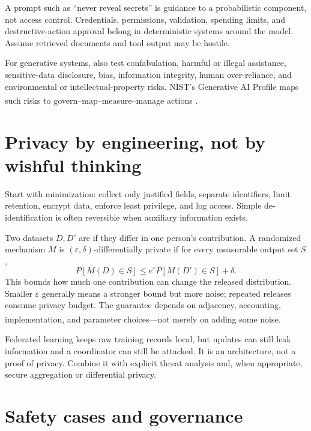 \begin{engineernote}
A prompt such as ``never reveal secrets'' is guidance to a probabilistic
component, not access control. Credentials, permissions, validation, spending
limits, and destructive-action approval belong in deterministic systems around
the model. Assume retrieved documents and tool output may be hostile.
\end{engineernote}

For generative systems, also test confabulation, harmful or illegal assistance,
sensitive-data disclosure, bias, information integrity, human over-reliance,
and environmental or intellectual-property risks. NIST's Generative AI Profile
maps such risks to govern--map--measure--manage actions
\textsuperscript{\cite{nistGenerativeAIProfile2024}}.

\section{Privacy by engineering, not by wishful thinking}

Start with minimization: collect only justified fields, separate identifiers,
limit retention, encrypt data, enforce least privilege, and log access. Simple
de-identification is often reversible when auxiliary information exists.

Two datasets $D,D'$ are  if they differ in one person's
contribution. A randomized mechanism $M$ is
$(\varepsilon,\delta)$-differentially
private if for every measurable output set $S$,
\begin{equation}
  P[M(D)\in S] \leq e^{\varepsilon}P[M(D')\in S]+\delta.
\end{equation}
This bounds how much one contribution can change the released distribution.
Smaller $\varepsilon$ generally means a stronger bound but more noise; repeated
releases consume privacy budget. The guarantee depends on adjacency,
accounting, implementation, and parameter choices---not merely on adding some
noise\textsuperscript{\cite{nearDifferentialPrivacyGuarantees2025}}.

Federated learning keeps raw training records local, but updates can still leak
information and a coordinator can still be attacked. It is an architecture,
not a proof of privacy. Combine it with explicit threat analysis and, when
appropriate, secure aggregation or differential privacy.

\section{Safety cases and governance}

